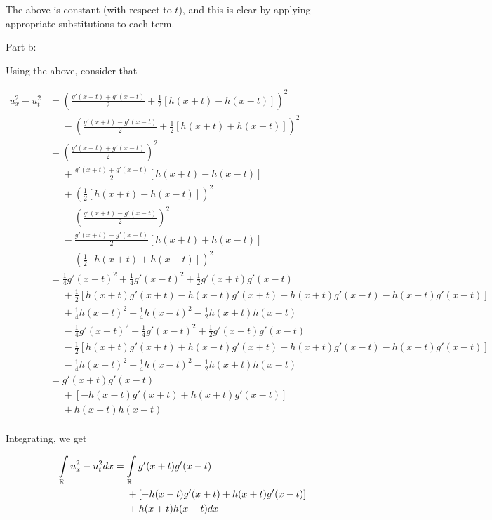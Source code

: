 \documentclass[a4paper,12pt]{article}
\begin{document}
The above is constant (with respect to $t$), and this is clear by applying appropriate substitutions to each term.

\shunt

Part b:

Using the above, consider that 

\begin{align*}
u_x^2 - u_t^2 &= \left(\frac{g'(x+t)+g'(x-t)}{2} + \frac{1}{2}\left[h(x+t) - h(x-t)\right]\right)^2 \\
&\phantom{{}={}}- \left(\frac{g'(x+t)-g'(x-t)}{2} + \frac{1}{2}\left[h(x+t) + h(x-t)\right]\right)^2\\
&= (\frac{g'(x+t)+g'(x-t)}{2})^2\\ &\phantom{{}={}}+ \frac{g'(x+t)+g'(x-t)}{2}\left[h(x+t) - h(x-t)\right]\\ &\phantom{{}={}}+ (\frac{1}{2}\left[h(x+t) - h(x-t)\right])^2 \\
&\phantom{{}={}}- (\frac{g'(x+t)-g'(x-t)}{2})^2\\ &\phantom{{}={}}-\frac{g'(x+t)-g'(x-t)}{2}\left[h(x+t) + h(x-t)\right] \\&\phantom{{}={}}- (\frac{1}{2}\left[h(x+t) + h(x-t)\right])^2\\
&= \frac{1}{4}g'(x+t)^2  + \frac{1}{4} g'(x-t)^2 + \frac{1}{2} g'(x+t)g'(x-t)\\ &\phantom{{}={}}+ \frac{1}{2}\left[h(x+t)g'(x+t) - h(x-t)g'(x+t) +h(x+t)g'(x-t) - h(x-t)g'(x-t) \right]\\ &\phantom{{}={}}+ \frac{1}{4}h(x+t)^2  + \frac{1}{4} h(x-t)^2 - \frac{1}{2} h(x+t)h(x-t)\\
&\phantom{{}={}}- \frac{1}{4}g'(x+t)^2  - \frac{1}{4} g'(x-t)^2 + \frac{1}{2} g'(x+t)g'(x-t)\\ &\phantom{{}={}}-\frac{1}{2}\left[h(x+t)g'(x+t) + h(x-t)g'(x+t) -h(x+t)g'(x-t) - h(x-t)g'(x-t) \right] \\&\phantom{{}={}}- \frac{1}{4}h(x+t)^2  - \frac{1}{4} h(x-t)^2 - \frac{1}{2} h(x+t)h(x-t)\\
&=  g'(x+t)g'(x-t)\\ &\phantom{{}={}}+ \left[ - h(x-t)g'(x+t) +h(x+t)g'(x-t) \right]\\ &\phantom{{}={}}+ h(x+t)h(x-t)\\
\end{align*}

Integrating, we get

\begin{align*}
\int\limits_\R u_x^2 - u_t^2 dx &=  \int\limits_\R g'(x+t)g'(x-t)\\ &\phantom{{}={}}+ \left[ - h(x-t)g'(x+t) +h(x+t)g'(x-t) \right]\\ &\phantom{{}={}}+ h(x+t)h(x-t) dx\\
\end{align*}
\end{document}
